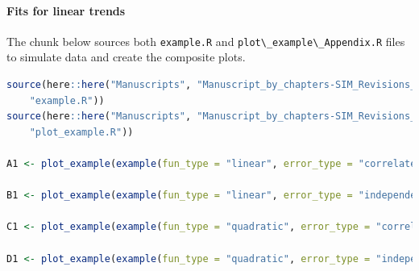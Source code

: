 \documentclass[
]{article}
\newcommand{\passthrough}[1]{#1}
\begin{document}
\hypertarget{fits-for-linear-trends}{%
\paragraph{Fits for linear trends}\label{fits-for-linear-trends}}

The chunk below sources both \passthrough{\lstinline!example.R!} and \passthrough{\lstinline!plot\_example\_Appendix.R!} files to simulate data and create the composite plots.

\begin{lstlisting}[language=R]
source(here::here("Manuscripts", "Manuscript_by_chapters-SIM_Revisions_final", "scripts",
    "example.R"))
source(here::here("Manuscripts", "Manuscript_by_chapters-SIM_Revisions_final", "scripts",
    "plot_example.R"))

A1 <- plot_example(example(fun_type = "linear", error_type = "correlated"), option = "composite")

B1 <- plot_example(example(fun_type = "linear", error_type = "independent"), option = "composite")

C1 <- plot_example(example(fun_type = "quadratic", error_type = "correlated"), option = "composite")

D1 <- plot_example(example(fun_type = "quadratic", error_type = "independent"), option = "composite")
\end{lstlisting}
\end{document}
